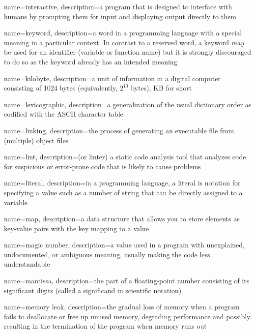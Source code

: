 {
  name=interactive,
  description={a program that is designed to interface with humans by prompting them for input and displaying output directly to them}
}

{
  name=keyword,
  description={a word in a programming language with a special meaning in a particular context.  In
	contrast to a reserved word, a keyword \emph{may} be used for an identifier (variable or function name)
	but it is strongly discouraged to do so as the keyword already has an intended meaning}
}

{
  name=kilobyte,
  description={a unit of information in a digital computer consisting of 1024 bytes (equivalently, $2^{10}$ bytes), KB for short}
}

{
  name=lexicographic,
  description={a generalization of the usual dictionary order as codified with the ASCII character table}
}

{
  name=linking,
  description={the process of generating an executable file from (multiple) object files}
}

{
  name=lint,
  description={(or linter) a static code analysis tool that analyzes code for suspicious or error-prone code that is likely to cause problems}
}

{
  name=literal,
  description={in a programming language, a literal is notation for specifying a value such as a number of string that can be 
  	directly assigned to a variable}
}

{
  name=map,
  description={a data structure that allows you to store elements as key-value pairs with the key mapping to a value}
}

{
  name=magic number,
  description={a value used in a program with unexplained, undocumented, or ambiguous meaning, usually making the code less understandable}
}

{
  name=mantissa,
  description={the part of a floating-point number consisting of its significant digits (called a significand in scientific notation)}
}

{
  name=memory leak,
  description={the gradual loss of memory when a program fails to deallocate or free up unused memory, degrading performance and possibly resulting in the termination of the program when memory runs out}
}

